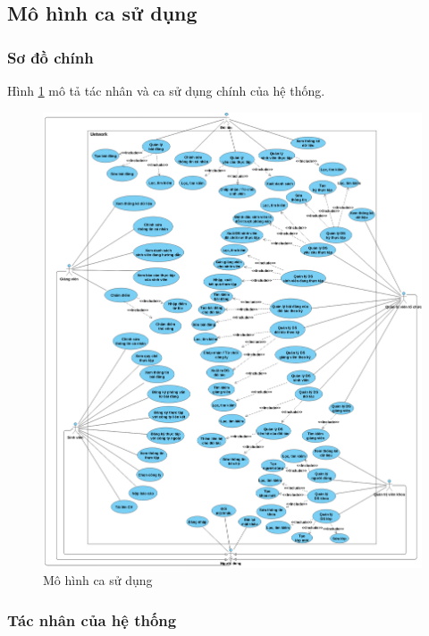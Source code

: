 \documentclass[./../main.tex]{subfiles}
\begin{document}
\subsection{Mô hình ca sử dụng}

\subsubsection{Sơ đồ chính}

Hình \ref{fig:use_case_diagram} mô tả tác nhân và ca sử dụng chính của hệ thống.

\begin{figure}[h!]
  \includegraphics[width=\linewidth]{./images/image4.png}
  \caption{Mô hình ca sử dụng}
  \label{fig:use_case_diagram}
\end{figure}

\subsubsection{Tác nhân của hệ thống}
\end{document}
